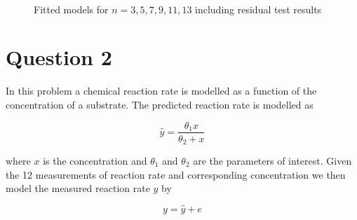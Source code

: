 \begin{figure}
    \mbox{\vspace{5mm}}
    \mbox{   \quad 
            }
    \caption{Fitted models for $n=3,5,7,9,11,13$ including residual test results}
    \label{fig:ex13}
\end{figure}


\section*{Question 2}

In this problem a chemical reaction rate is modelled as a function of the concentration of a substrate. The predicted reaction rate is modelled as

\begin{equation*}
    \hat{y} = \frac{\theta_1 x}{\theta_2 + x}
\end{equation*}

where $x$ is the concentration and $\theta_1$ and $\theta_2$ are the parameters of interest. Given the 12 measurements of reaction rate and corresponding concentration we then model the measured reaction rate $y$ by

\begin{equation}\label{eq:ex21-base-model}
    y = \hat{y} + e
\end{equation}

